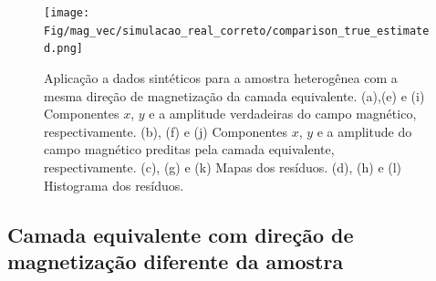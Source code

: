 \begin{figure}
	\centering
	\texttt{[image: Fig/mag\_vec/simulacao\_real\_correto/comparison\_true\_estimated.png]}
	\caption{Aplicação a dados sintéticos para a amostra heterogênea com a mesma direção de magnetização da camada equivalente. (a),(e) e (i) Componentes $x$, $y$ e a amplitude verdadeiras do campo magnético, respectivamente. (b), (f) e (j) Componentes $x$, $y$ e a amplitude do campo magnético preditas pela camada equivalente, respectivamente. (c), (g) e (k) Mapas dos resíduos. (d), (h) e (l) Histograma dos resíduos.}
	\label{fig:comparison_hetero_sample_samedir}
\end{figure}


\subsection{Camada equivalente com direção de magnetização diferente da amostra}
\label{subsec:hetero_dif_dir}

